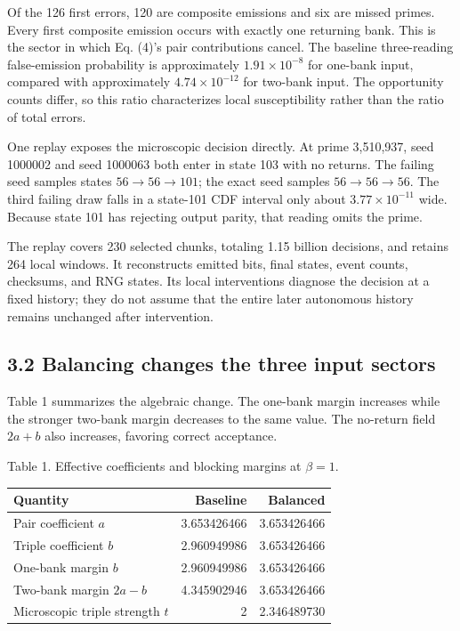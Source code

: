 \documentclass[
  11pt,
]{article}
\newcounter{none} %
\begin{document}
Of the 126 first errors, 120 are composite emissions and six are missed
primes. Every first composite emission occurs with exactly one returning
bank. This is the sector in which Eq. (4)'s pair contributions cancel.
The baseline three-reading false-emission probability is approximately
\(1.91\times10^{-8}\) for one-bank input, compared with approximately
\(4.74\times10^{-12}\) for two-bank input. The opportunity counts
differ, so this ratio characterizes local susceptibility rather than the
ratio of total errors.

One replay exposes the microscopic decision directly. At prime
3,510,937, seed 1000002 and seed 1000063 both enter in state 103 with no
returns. The failing seed samples states \(56\to56\to101\); the exact
seed samples \(56\to56\to56\). The third failing draw falls in a
state-101 CDF interval only about \(3.77\times10^{-11}\) wide. Because
state 101 has rejecting output parity, that reading omits the prime.

The replay covers 230 selected chunks, totaling 1.15 billion decisions,
and retains 264 local windows. It reconstructs emitted bits, final
states, event counts, checksums, and RNG states. Its local interventions
diagnose the decision at a fixed history; they do not assume that the
entire later autonomous history remains unchanged after intervention.

\subsection{3.2 Balancing changes the three input
sectors}\label{balancing-changes-the-three-input-sectors}

Table 1 summarizes the algebraic change. The one-bank margin increases
while the stronger two-bank margin decreases to the same value. The
no-return field \(2a+b\) also increases, favoring correct acceptance.

Table 1. Effective coefficients and blocking margins at \(\beta=1\).

{\def\LTcaptype{none} %
\begin{longtable}[]{@{}lrr@{}}
\toprule\noalign{}
Quantity & Baseline & Balanced \\
\midrule\noalign{}
\endhead
\bottomrule\noalign{}
\endlastfoot
Pair coefficient \(a\) & 3.653426466 & 3.653426466 \\
Triple coefficient \(b\) & 2.960949986 & 3.653426466 \\
One-bank margin \(b\) & 2.960949986 & 3.653426466 \\
Two-bank margin \(2a-b\) & 4.345902946 & 3.653426466 \\
Microscopic triple strength \(t\) & 2 & 2.346489730 \\
\end{longtable}
}
\end{document}
